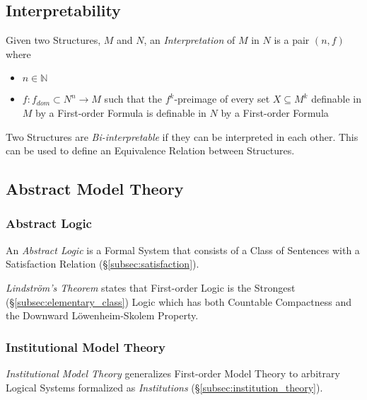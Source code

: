 \subsection{Interpretability}

Given two Structures, $M$ and $N$, an \emph{Interpretation} of $M$ in
$N$ is a pair $(n,f)$ where
\begin{itemize}
    \item $n \in \mathbb{N}$
    \item $f:f_{dom} \subset N^n \rightarrow M$ such that the
      $f^k$-preimage of every set $X \subseteq M^k$ definable in $M$
      by a First-order Formula is definable in $N$ by a First-order
      Formula
\end{itemize}

Two Structures are \emph{Bi-interpretable} if they can be interpreted
in each other. This can be used to define an Equivalence Relation
between Structures.

\subsection{Abstract Model Theory}

\subsubsection{Abstract Logic}

An \emph{Abstract Logic} is a Formal System that consists of a Class
of Sentences with a Satisfaction Relation
(\S\ref{subsec:satisfaction}).

\emph{Lindstr\"om's Theorem} states that First-order Logic is the
Strongest (\S\ref{subsec:elementary_class}) Logic which has both
Countable Compactness and the Downward L\"owenheim-Skolem Property.

\subsubsection{Institutional Model Theory}

\emph{Institutional Model Theory} generalizes First-order Model Theory
to arbitrary Logical Systems formalized as \emph{Institutions}
(\S\ref{subsec:institution_theory}).

